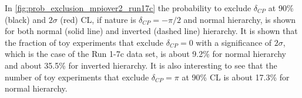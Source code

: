%


In \cref{fig:prob_exclusion_mpiover2_run17c} 
the probability to exclude $\delta_{CP}$ at 90\% (black) and $2\sigma$ (red) CL, 
if nature is $\delta_{CP}=-\pi/2$ and normal hierarchy, is shown
for both normal (solid line) and inverted (dashed line) hierarchy.
It is shown that the fraction of toy experiments that exclude $\delta_{CP}=0$
with a significance of $2\sigma$,
which is the case of the Run 1-7c data set,  
is about 9.2\%
for normal hierarchy and about 35.5\% for inverted hierarchy.
It is also interesting to see that the 
number of toy experiments that exclude $\delta_{CP} = \pi$
at 90\% CL is about 17.3\% for normal hierarchy.

